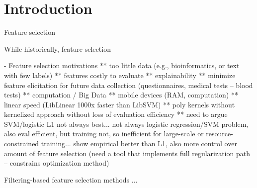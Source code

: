 \section{Introduction}

Feature selection~\cite{guyon_jmlr03} 

While historically, feature selection 

\COMMENT
- Feature selection motivations
** too little data (e.g., bioinformatics, or text with few labels)
** features costly to evaluate
** explainability
** minimize feature elicitation for future data collection (questionnaires, medical tests -- blood tests)
** computation / Big Data
** mobile devices (RAM, computation)
** linear speed (LibLinear 1000x faster than LibSVM)
** poly kernels without kernelized approach without loss of evaluation efficiency
** need to argue SVM/logistic L1 not always best... not always logistic regression/SVM problem, also eval efficient, but training not, so 
inefficient for large-scale or resource-constrained training... show empirical better than L1, also more control over amount of feature 
selection (need a tool that implements full regularization path -- constrains optimization method)


Filtering-based feature selection methods ...


